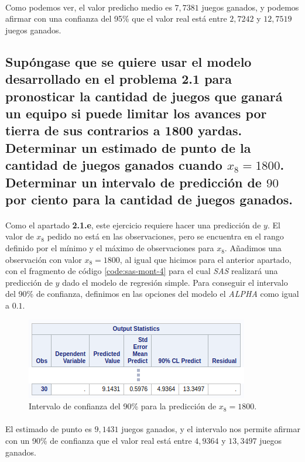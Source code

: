 \documentclass{article}
\begin{document}
  \paragraph{}
  Como podemos ver, el valor predicho medio es $7,7381$ juegos ganados, y podemos afirmar con una confianza del 95\% que el valor real está entre $2,7242$ y $12,7519$ juegos ganados.

  \subsection{Supóngase que se quiere usar el modelo desarrollado en el problema 2.1 para pronosticar la cantidad de juegos que ganará un equipo si puede limitar los avances por tierra de sus contrarios a 1800 yardas. Determinar un estimado de punto de la cantidad de juegos ganados cuando $x_8=1800$. Determinar un intervalo de predicción de $90$ por ciento para la cantidad de juegos ganados.}

  \paragraph{}
  Como el apartado \textbf{2.1.e}, este ejercicio requiere hacer una predicción de $y$. El valor de $x_8$ pedido no está en las observaciones, pero se encuentra en el rango definido por el mínimo y el máximo de observaciones para $x_8$. Añadimos una observación con valor $x_8=1800$, al igual que hicimos para el anterior apartado, con el fragmento de código \ref{code:sas-mont-4} para el cual \textit{SAS} realizará una predicción de $y$ dado el modelo de regresión simple. Para conseguir el intervalo del 90\% de confianza, definimos en las opciones del modelo el \textit{ALPHA} como igual a $0.1$.

  \begin{figure}[H]
    \centering
    \includegraphics[width=.5\linewidth]{img/montgomery/prediccion1800.png}
    \caption{Intervalo de confianza del 90\% para la predicción de $x_8=1800$.}
    \label{img:mont-prediccion1800}
  \end{figure}

  \paragraph{}
  El estimado de punto es $9,1431$ juegos ganados, y el intervalo nos permite afirmar con un 90\% de confianza que el valor real está entre $4,9364$ y $13,3497$ juegos ganados.
\end{document}
